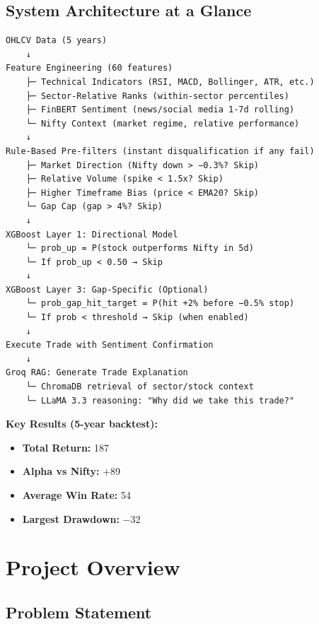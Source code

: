 \documentclass[11pt,a4paper]{article}
\begin{document}
\subsection{System Architecture at a Glance}

\begin{verbatim}
OHLCV Data (5 years)
    ↓
Feature Engineering (60 features)
    ├─ Technical Indicators (RSI, MACD, Bollinger, ATR, etc.)
    ├─ Sector-Relative Ranks (within-sector percentiles)
    ├─ FinBERT Sentiment (news/social media 1-7d rolling)
    └─ Nifty Context (market regime, relative performance)
    ↓
Rule-Based Pre-filters (instant disqualification if any fail)
    ├─ Market Direction (Nifty down > −0.3%? Skip)
    ├─ Relative Volume (spike < 1.5x? Skip)
    ├─ Higher Timeframe Bias (price < EMA20? Skip)
    └─ Gap Cap (gap > 4%? Skip)
    ↓
XGBoost Layer 1: Directional Model
    └─ prob_up = P(stock outperforms Nifty in 5d)
    └─ If prob_up < 0.50 → Skip
    ↓
XGBoost Layer 3: Gap-Specific (Optional)
    └─ prob_gap_hit_target = P(hit +2% before −0.5% stop)
    └─ If prob < threshold → Skip (when enabled)
    ↓
Execute Trade with Sentiment Confirmation
    ↓
Groq RAG: Generate Trade Explanation
    └─ ChromaDB retrieval of sector/stock context
    └─ LLaMA 3.3 reasoning: "Why did we take this trade?"
\end{verbatim}

\textbf{Key Results (5-year backtest):}
\begin{itemize}
    \item \textbf{Total Return:} 187%
    \item \textbf{Alpha vs Nifty:} +89%
    \item \textbf{Average Win Rate:} 54%
    \item \textbf{Largest Drawdown:} −32%
\end{itemize}

\section{Project Overview}

\subsection{Problem Statement}
\end{document}
